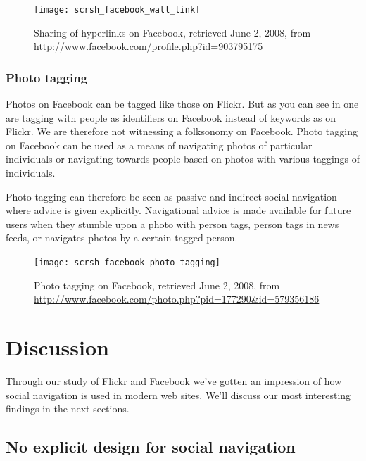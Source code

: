 \begin{figure}
  \texttt{[image: scrsh\_facebook\_wall\_link]}
  \caption[Facebook Hyperlink Sharing]{%
     Sharing of hyperlinks on Facebook,
     retrieved June 2, 2008, from
     \url{http://www.facebook.com/profile.php?id=903795175}}
  \label{figure:scrsh.facebook.wall.link}
\end{figure}

\subsubsection{Photo tagging}

Photos on Facebook can be tagged  like those on Flickr.
But as you can see in  one are
tagging with people as identifiers on Facebook instead of keywords as on
Flickr. We are
therefore not witnessing a folksonomy on Facebook. Photo tagging on Facebook
can be used as a means of navigating photos of particular individuals or
navigating towards people based on photos with various taggings of
individuals.

Photo tagging can therefore be seen as passive and indirect social navigation
where advice is given explicitly.
Navigational advice is made available for future users when they stumble upon
a photo with person tags, person tags in news feeds, or navigates photos by a
certain tagged person.

\begin{figure}
  \texttt{[image: scrsh\_facebook\_photo\_tagging]}
  \caption[Facebook Photo Tagging]{%
     Photo tagging on Facebook,
     retrieved June 2, 2008, from
     \url{http://www.facebook.com/photo.php?pid=177290&id=579356186}}
  \label{figure:scrsh.facebook.photo.tagging}
\end{figure}

\section{Discussion}

Through our study of Flickr and Facebook we've gotten an impression of how
social navigation is used in modern web sites. We'll discuss our most
interesting findings in the next sections.

\subsection{No explicit design for social navigation}

